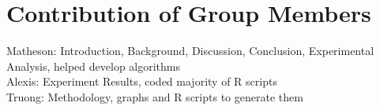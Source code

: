 \documentclass[letterpaper, 11pt]{article}%
\begin{document}
\section{Contribution of Group Members}
Matheson: Introduction, Background, Discussion, Conclusion, Experimental Analysis, helped develop algorithms\\ Alexis: Experiment Results, coded majority of R scripts  \\ Truong: Methodology, graphs and R scripts to generate them

\newpage


\end{document}
